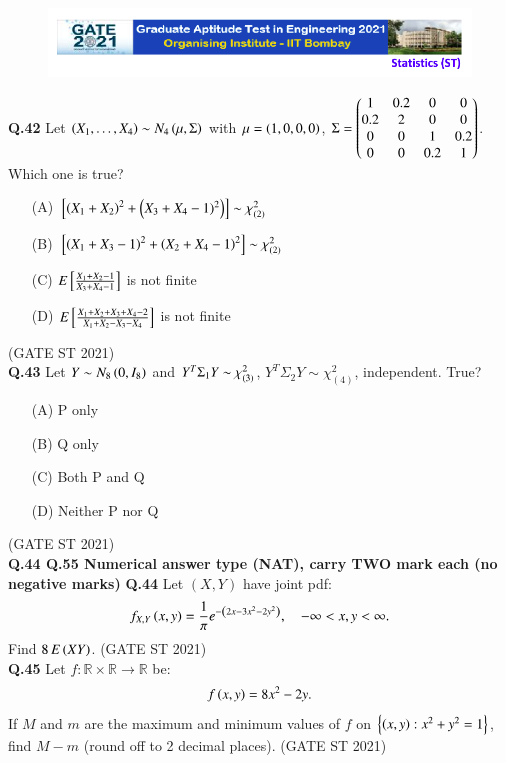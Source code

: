 \documentclass[journal,12pt,onecolumn]{IEEEtran}
\theoremstyle{remark}
\begin{document}
\begin{figure}
 \centering
    \includegraphics[width=1\linewidth]{figs/0.png} 
\end{figure}
\textbf{Q.42}
Let $\left(X_1,\dots,X_4\right) \sim N_4\left(\mu,\Sigma\right)$ with  
$\mu = \left(1,0,0,0\right)$, $\Sigma = \begin{pmatrix} 1 & 0.2 & 0 & 0 \\ 0.2 & 2 & 0 & 0 \\ 0 & 0 & 1 & 0.2 \\ 0 & 0 & 0.2 & 1 \end{pmatrix}$.  
Which one is true?
\begin{enumerate}
\item[(A)] ${}\left[\left(X_1+X_2\right)^2 + \left(X_3+X_4-1)^2\right)\right] \sim \chi^2_{(2)}$
\item[(B)] ${}\left[\left(X_1+X_3-1\right)^2 + \left(X_2+X_4-1\right)^2\right]\sim \chi^2_{(2)}$
\item[(C)] $E{}\left[\frac{X_1+X_2-1}{X_3+X_4-1}\right]$ is not finite
\item[(D)] $E{}\left[ \frac{X_1+X_2+X_3+X_4-2}{X_1+X_2-X_3-X_4} \right]$ is not finite
\end{enumerate}
\hfill (GATE ST 2021) \\

\textbf{Q.43}
Let $Y \sim N_8\left(0,I_8\right)$ and $Y^T\Sigma_1Y \sim \chi^2_{\left(3\right)}$, $Y^T\Sigma_2Y \sim \chi^2_{(4)}$, independent. True?
\begin{enumerate}
\item[(A)] P only
\item[(B)] Q only
\item[(C)] Both P and Q
\item[(D)] Neither P nor Q
\end{enumerate}
\hfill (GATE ST 2021) \\

\textbf{Q.44 \text{-} Q.55 Numerical answer type   (NAT), carry TWO mark each (no negative marks)}
\textbf{Q.44}
Let $(X,Y)$ have joint pdf:
\[
f_{X,Y}\left(x,y\right) = \frac{1}{\pi} e^{-\left(2x - 3x^2 - 2y^2\right)}, \quad -\infty < x,y < \infty.
\]
Find $8 \, E\left(XY\right)$.
\hfill (GATE ST 2021) \\

\textbf{Q.45}
Let $f: \mathbb{R} \times \mathbb{R} \to \mathbb{R}$ be:
\[
f\left(x,y\right)= 8x^2 - 2y.
\]
If $M$ and $m$ are the maximum and minimum values of $f$ on $\left\{ \left(x,y\right) : x^2 + y^2 = 1 \right\}$,  
find $M - m$ (round off to 2 decimal places).
\hfill (GATE ST 2021) \\
\end{document}
